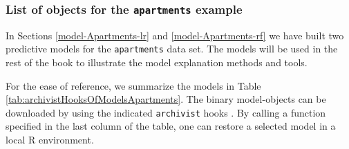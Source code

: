 \documentclass[12pt,]{krantz}
\begin{document}
\hypertarget{ListOfModelsApartments}{%
\subsubsection{\texorpdfstring{List of objects for the \texttt{apartments} example}{List of objects for the apartments example}}\label{ListOfModelsApartments}}

In Sections \ref{model-Apartments-lr} and \ref{model-Apartments-rf} we have built two predictive models for the \texttt{apartments} data set. The models will be used in the rest of the book to illustrate the model explanation methods and tools.

For the ease of reference, we summarize the models in Table \ref{tab:archivistHooksOfModelsApartments}. The binary model-objects can be downloaded by using the indicated \texttt{archivist} hooks \citep{archivist}. By calling a function specified in the last column of the table, one can restore a selected model in a local R environment.
\end{document}
